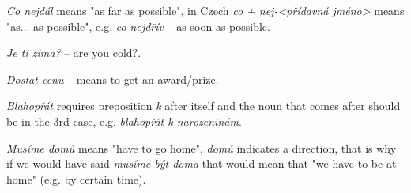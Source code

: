 \documentclass[12pt]{book}
\begin{document}
\emph{Co nejdál} means "as far as possible", in Czech \emph{co + nej-<přídavná jméno>} means "as... as possible", 
e.g. \emph{co nejdřív} -- as soon as possible.

\emph{Je ti zima?} -- are you cold?.

\emph{Dostat cenu} -- means to get an award/prize.

\emph{Blahopřát} requires preposition \emph{k} after itself and the noun that comes after should be in the 3rd case, 
e.g. \emph{blahopřát k narozeninám}.

\emph{Musíme domů} means "have to go home", \emph{domů} indicates a direction, that is why if we would have said 
\emph{musíme být doma} that would mean that "we have to be at home" (e.g. by certain time).
\end{document}
